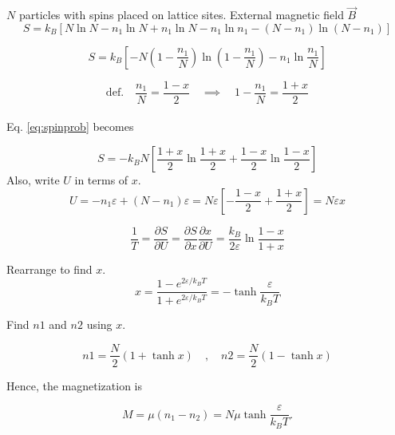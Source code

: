 \begin{problem}{$N$ particles with spins placed on lattice sites. External magnetic field $\Vec{B}$}
\begin{equation}
    S = k_B\left[N\ln{N}-n_1\ln{N}+n_1\ln{N}-n_1\ln{n_1}-(N-n_1)\ln{(N-n_1)}\right]
\end{equation}

\begin{equation}
    S=k_B\left[-N(1-\frac{n_1}{N})\ln{(1-\frac{n_1}{N})}-n_1\ln{\frac{n_1}{N}}\right]
    \label{eq:spinprob}
\end{equation}

\begin{equation*}
    \mathrm{def.}\quad \frac{n_1}{N}= \frac{1-x}{2} \quad \implies \quad 1-\frac{n_1}{N}= \frac{1+x}{2}
\end{equation*}
\\
Eq. \ref{eq:spinprob} becomes

\begin{equation}
    S=-k_B N\left[ \frac{1+x}{2}\ln{\frac{1+x}{2}}+\frac{1-x}{2}\ln{\frac{1-x}{2}}\right]
\end{equation}
Also, write $U$ in terms of $x$.
\begin{equation}
    U=-n_1\varepsilon + (N-n_1)\varepsilon = N\varepsilon\left[-\frac{1-x}{2}+\frac{1+x}{2}\right] = N\varepsilon x
\end{equation}

\begin{equation}
    \frac{1}{T}=\frac{\partial S}{\partial U} =\frac{\partial S}{\partial x}\frac{\partial x}{\partial U} = \frac{k_B}{2\varepsilon}\ln{\frac{1-x}{1+x}}
\end{equation}

Rearrange to find $x$.
\begin{equation}
    x = \frac{1-e^{2\varepsilon/k_B T}}{1+e^{2\varepsilon/k_B T}} = - \tanh{\frac{\varepsilon}{k_B T}}
\end{equation}

Find $n1$ and $n2$ using $x$.

\begin{equation}
    n1=\frac{N}{2}(1+\tanh{x}) \quad,\quad n2=\frac{N}{2}(1-\tanh{x})
\end{equation}

Hence, the magnetization is

\begin{equation}
    M=\mu (n_1-n_2)=N\mu \tanh{\frac{\varepsilon}{k_B T}} .
\end{equation}


\end{problem}

